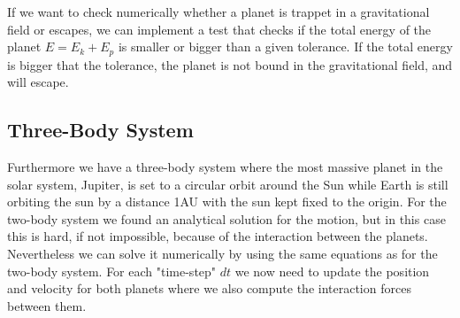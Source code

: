 \documentclass[norsk,a4paper,12pt]{article}
\begin{document}
If we want to check numerically whether a planet is trappet in a gravitational field or escapes, we can implement a test that checks if the total energy of the planet $E = E_k + E_p$ is smaller or bigger than a given tolerance. If the total energy is bigger that the tolerance, the planet is not bound in the gravitational field, and will escape.

\subsection{Three-Body System}
Furthermore we have a three-body system where the most massive planet in the solar system, Jupiter, is set to a circular orbit around the Sun while Earth is still orbiting the sun by a distance 1AU with the sun kept fixed to the origin. For the two-body system we found an analytical solution for the motion, but in this case this is hard, if not impossible, because of the interaction between the planets. Nevertheless we can solve it numerically by using the same equations as for the two-body system. For each "time-step" $dt$ we now need to update the position and velocity for both planets where we also compute the interaction forces between them. 
\end{document}
